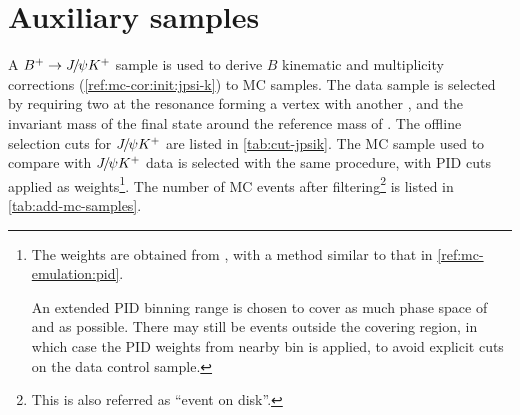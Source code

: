 \section{Auxiliary samples}
\label{ref:sel:aux}

A ${{{B}^+}} \rightarrow {\ensuremath{{J\mskip -3mu/\mskip -2mu\psi}}} {\ensuremath{{K}^+}}$ sample is used to derive $B$ kinematic and
multiplicity corrections
(\cref{ref:mc-cor:init:jpsi-k})
to MC samples.
The data sample is selected by requiring
two \muon at the \jpsi resonance forming a vertex with another \kaon,
and the invariant mass of the \mup\mun\Kp final state around the reference mass
of \Bp.
The offline selection cuts for ${{J\mskip -3mu/\mskip -2mu\psi}}{{K}^+}$ are listed in
\cref{tab:cut-jpsik}.
The MC sample used to compare with ${{J\mskip -3mu/\mskip -2mu\psi}} {{K}^+}$ data is selected with the same
procedure, with PID cuts applied as weights\footnote{
    The weights are obtained from \pidcalib, with a method similar to that in
    \cref{ref:mc-emulation:pid}.

    An extended PID binning range is chosen to cover as much phase space of
    \kaon and \muon as possible.
    There may still be events outside the covering region, in which case the PID
    weights from nearby bin is applied,
    to avoid explicit cuts on the \jpsi\kaon data control sample.
}.
The number of MC events after filtering\footnote{
    This is also referred as ``event on disk''.
} is listed in \cref{tab:add-mc-samples}.

